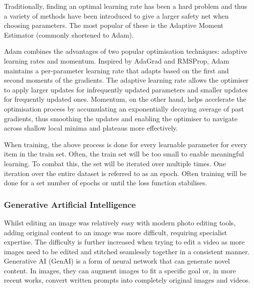 Traditionally, finding an optimal learning rate has been a hard problem and thus a variety of methods have been introduced to give a larger safety net when choosing parameters. The most popular of these is the Adaptive Moment Estimator (commonly shortened to Adam)\cite{kingma2014adam}.

Adam combines the advantages of two popular optimisation techniques: adaptive learning rates and momentum. Inspired by AdaGrad \cite{duchi2011adaptive} and RMSProp, Adam maintains a per-parameter learning rate that adapts based on the first and second moments of the gradients. The adaptive learning rate allows the optimiser to apply larger updates for infrequently updated parameters and smaller updates for frequently updated ones. Momentum, on the other hand, helps accelerate the optimisation process by accumulating an exponentially decaying average of past gradients, thus smoothing the updates and enabling the optimiser to navigate across shallow local minima and plateaus more effectively.

When training, the above process is done for every learnable parameter for every item in the train set. Often, the train set will be too small to enable meaningful learning. To combat this, the set will be iterated over multiple times. One iteration over the entire dataset is referred to as an epoch\cite{begmann-backpropagation}. Often training will be done for a set number of epochs or until the loss function stabilises. 

\subsubsection{Generative Artificial Intelligence}

Whilst editing an image was relatively easy with modern photo editing tools, adding original content to an image was more difficult, requiring specialist expertise. The difficulty is further increased when trying to edit a video as more images need to be edited and stitched seamlessly together in a consistent manner. Generative AI (GenAI) is a form of neural network that can generate novel content. In images, they can augment images to fit a specific goal or, in more recent works, convert written prompts into completely original images and videos.

